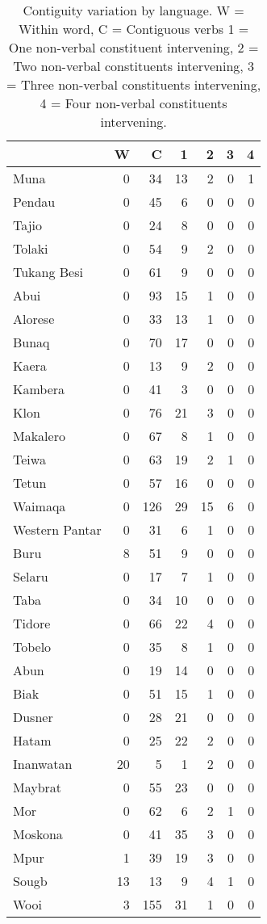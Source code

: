\begin{table}


\begin{tabular}{lrrrrrr}
  \hline\hline
 & W & C & 1 & 2 & 3 & 4 \tabularnewline 
  \hline
Muna &   0 &  34 &  13 &   2 &   0 &   1 \tabularnewline 
  Pendau &   0 &  45 &   6 &   0 &   0 &   0 \tabularnewline 
  Tajio &   0 &  24 &   8 &   0 &   0 &   0 \tabularnewline 
  Tolaki &   0 &  54 &  9 &   2 &   0 &   0 \tabularnewline 
  Tukang Besi &   0 &  61 &   9 &   0 &   0 &   0 \tabularnewline \hline
  Abui &   0 &  93 &  15 &   1 &   0 &   0 \tabularnewline 
  Alorese &   0 &  33 &  13 &   1 &   0 &   0 \tabularnewline 
  Bunaq &   0 &  70 &  17 &   0 &   0 &   0 \tabularnewline 
  Kaera &   0 &  13 &  9 &   2 &   0 &   0 \tabularnewline 
  Kambera &   0 &  41 &   3 &   0 &   0 &   0 \tabularnewline 
  Klon &   0 &  76 &  21 &   3 &   0 &   0 \tabularnewline 
  Makalero &   0 &  67 &  8 &   1 &   0 &   0 \tabularnewline 
  Teiwa &   0 &  63 &  19 &   2 &  1 &   0 \tabularnewline 
  Tetun &   0 &  57 &  16 &   0 &   0 &   0 \tabularnewline 
  Waimaqa &   0 & 126 &  29 &  15 &   6 &   0 \tabularnewline 
  Western Pantar &   0 &  31 &   6 &   1 &   0 &   0 \tabularnewline \hline
  Buru & 8 & 51 & 9 & 0 & 0 & 0 \tabularnewline
  Selaru &   0 &  17 &  7 &  1 &   0 &   0 \tabularnewline 
  Taba &   0 &  34 &  10 &   0 &   0 &   0 \tabularnewline 
  Tidore & 0 & 66 & 22 & 4 & 0 & 0 \tabularnewline
  Tobelo &   0 &  35 &  8 &   1 &   0 &   0 \tabularnewline 
\hline
  Abun &   0 &  19 &  14 &   0 &   0 &   0 \tabularnewline 
  Biak &   0 &  51 &  15 &   1 &   0 &   0 \tabularnewline 
  Dusner &   0 &  28 &  21 &   0 &   0 &   0 \tabularnewline 
  Hatam &   0 &  25 &  22 &   2 &   0 &   0 \tabularnewline 
  Inanwatan &  20 &  5 &   1 &   2 &   0 &   0 \tabularnewline
  Maybrat &   0 &  55 &  23 &   0 &   0 &   0 \tabularnewline 
  Mor &   0 &  62 &  6 &   2 &   1 &   0 \tabularnewline 
  Moskona &   0 &  41 &  35 &   3 &   0 &   0 \tabularnewline 
  Mpur &   1 &  39 &  19 &   3 &   0 &   0 \tabularnewline 
  Sougb &  13 &   13 &  9 &   4 &   1 &   0 \tabularnewline 
  Wooi &   3 & 155 &  31 &   1 &   0 &   0\tabularnewline 
   \hline\hline
\end{tabular}
\caption[Contiguity variation by language]{Contiguity variation by language. W = Within word, C = Contiguous verbs 1 = One non-verbal constituent intervening, 2 = Two non-verbal constituents intervening, 3 = Three non-verbal constituents intervening, 4 = Four non-verbal constituents intervening.}
\label{table:Contiguity_per_lang}


\end{table}


